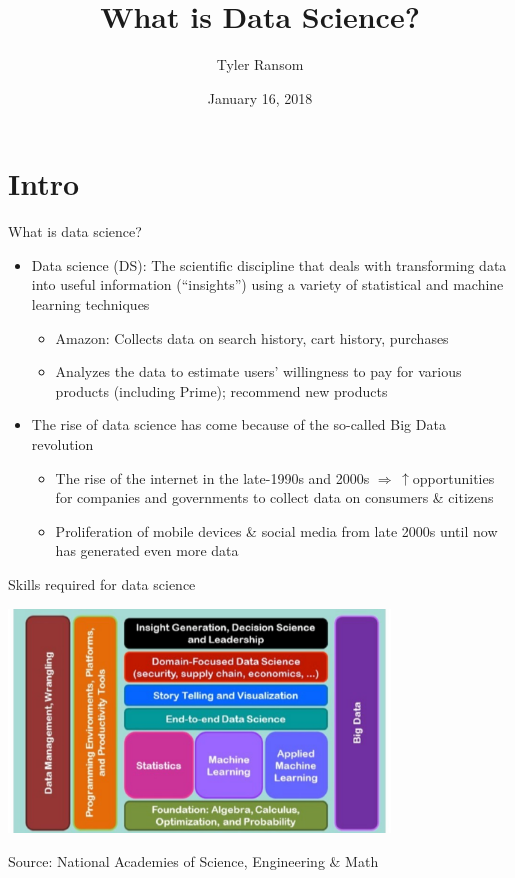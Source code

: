 \documentclass[english,aspectratio=169,12pt,xcolor=dvipsnames]{beamer}
\title{What is Data Science?}
\author{Tyler Ransom}
\institute[OU Econ]{\normalsize{University of Oklahoma, Dept. of Economics}}
\date{January 16, 2018}
\begin{document}
{
\frame[noframenumbering]{\titlepage}
}


\section{Intro}
\begin{frame}{What is data science?}
\begin{itemize}
\item \alert{Data science (DS):} The scientific discipline that deals with transforming data into useful information (``insights'') using a variety of statistical and machine learning techniques
    \begin{itemize}
    \item \alert{Amazon:} Collects data on search history, cart history, purchases
    \item Analyzes the data to estimate users' willingness to pay for various products (including Prime); recommend new products
    \end{itemize}
\item The rise of data science has come because of the so-called Big Data revolution
    \begin{itemize}
    \item The rise of the internet in the late-1990s and 2000s $\Rightarrow \,\uparrow$opportunities for companies and governments to collect data on consumers \& citizens
    \item Proliferation of mobile devices \& social media from late 2000s until now has generated even more data
    \end{itemize}
\end{itemize}
\end{frame}


\begin{frame}{Skills required for data science}
\begin{center}
\includegraphics[width=0.76\textwidth]{../Graphics/NASEMdatasci.eps}
\end{center}
{\scriptsize Source: National Academies of Science, Engineering \& Math}
\end{frame}
\end{document}
